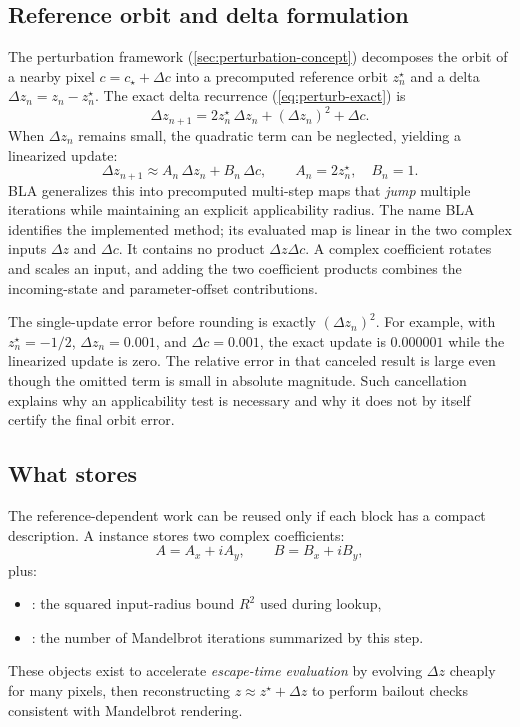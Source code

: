 \subsection{Reference orbit and delta formulation}
The perturbation framework (\cref{sec:perturbation-concept}) decomposes
the orbit of a nearby pixel \(c = c_\star + \Delta c\) into a
precomputed reference orbit \(z_n^\star\) and a delta
\(\Delta z_n = z_n - z_n^\star\).  The exact delta recurrence
(\cref{eq:perturb-exact}) is
\[
\Delta z_{n+1} = 2z_n^\star\,\Delta z_n + (\Delta z_n)^2 + \Delta c.
\]
When \(\Delta z_n\) remains small, the quadratic term can be neglected,
yielding a linearized update:
\begin{equation}
\Delta z_{n+1} \approx A_n\,\Delta z_n + B_n\,\Delta c,\qquad
A_n = 2z_n^\star,\quad B_n = 1.
\label{eq:bla-v1-one-step}
\end{equation}
BLA generalizes this into precomputed multi-step maps that \emph{jump} multiple
iterations while maintaining an explicit applicability radius. The name BLA
identifies the implemented method; its evaluated map is linear in the two
complex inputs $\Delta z$ and $\Delta c$. It contains no product
$\Delta z\Delta c$. A complex coefficient rotates and scales an input, and
adding the two coefficient products combines the incoming-state and
parameter-offset contributions.

The single-update error before rounding is exactly $(\Delta z_n)^2$.
For example, with $z_n^\star=-1/2$, $\Delta z_n=0.001$, and
$\Delta c=0.001$, the exact update is $0.000001$ while the linearized
update is zero. The relative error in that canceled result is large even
though the omitted term is small in absolute magnitude. Such cancellation
explains why an applicability test is necessary and why it does not by itself
certify the final orbit error.

\subsection{What  stores}
The reference-dependent work can be reused only if each block has a compact
description. A  instance stores two complex coefficients:
\[
A = A_x + iA_y,\qquad B = B_x + iB_y,
\]
plus:
\begin{itemize}
  \item {}: the squared input-radius bound $R^2$ used during lookup,
  \item {}: the number of Mandelbrot iterations summarized by this step.
\end{itemize}
These objects exist to accelerate \emph{escape-time evaluation} by evolving
\(\Delta z\) cheaply for many pixels, then reconstructing \(z \approx z^\star +
\Delta z\) to perform bailout checks consistent with Mandelbrot rendering.

